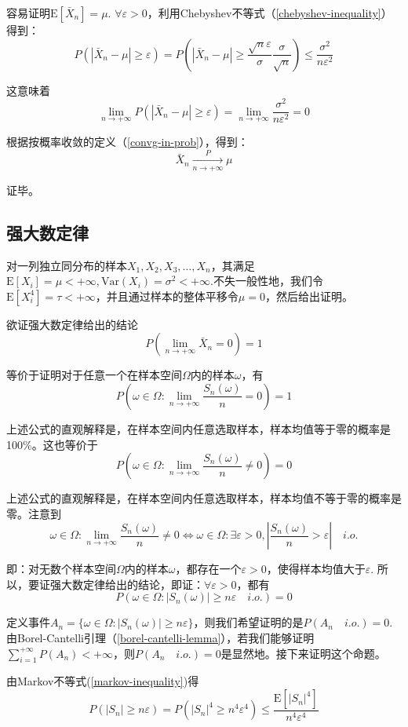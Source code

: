 \documentclass[UTF8]{ctexbook}
\begin{document}
容易证明$\mathrm E[\bar{X}_n]=\mu$. $\forall\varepsilon>0$，利用Chebyshev不等式（\ref{chebyshev-inequality}）得到：
\[
	P(|\bar{X}_n-\mu|\geq\varepsilon)=P(|\bar{X}_n-\mu|\geq\frac{\sqrt{n}\varepsilon}{\sigma}\frac{\sigma}{\sqrt{n}})\leq\frac{\sigma^2}{n\varepsilon^2}
\]

这意味着
\[
	\lim_{n\to+\infty}P(|\bar{X}_n-\mu|\geq\varepsilon)=\lim_{n\to+\infty}\frac{\sigma^2}{n\varepsilon^2}=0
\]

根据按概率收敛的定义（\ref{convg-in-prob}），得到：
\[
	\bar{X}_n\xrightarrow[n\to+\infty]{P}\mu
\]

证毕。
\subsection{强大数定律}
\label{SLLN-proof}
对一列独立同分布的样本$X_1,X_2,X_3,\dots,X_n$，其满足$\mathrm E[X_i]=\mu<+\infty,\mathrm{Var}(X_i)=\sigma^2<+\infty$.不失一般性地，我们令$\mathrm E[X_i^4]=\tau<+\infty$，并且通过样本的整体平移令$\mu=0$，然后给出证明。

欲证强大数定律给出的结论
\[
	P\left(\lim_{n\to+\infty}\bar{X}_n=0\right)=1
\]

等价于证明对于任意一个在样本空间$\Omega$内的样本$\omega$，有
\[
	P\left(\omega\in\Omega:\lim_{n\to+\infty}\frac{S_n(\omega)}{n}=0\right)=1
\]

上述公式的直观解释是，在样本空间内任意选取样本，样本均值等于零的概率是100\%。这也等价于
\[
	P\left(\omega\in\Omega:\lim_{n\to+\infty}\frac{S_n(\omega)}{n}\neq0\right)=0
\]

上述公式的直观解释是，在样本空间内任意选取样本，样本均值不等于零的概率是零。注意到
\[
	\omega\in\Omega:\lim_{n\to+\infty}\frac{S_n(\omega)}{n}\neq0\Longleftrightarrow\omega\in\Omega:\exists\varepsilon>0,\left|\frac{S_n(\omega)}{n}>\varepsilon\right|\quad i.o.
\]

即：对无数个样本空间$\Omega$内的样本$\omega$，都存在一个$\varepsilon>0$，使得样本均值大于$\varepsilon$. 所以，要证强大数定律给出的结论，即证：$\forall\varepsilon>0$，都有
\[
	P\left(\omega\in\Omega:|S_n(\omega)|\geq n\varepsilon\quad i.o.\right)=0
\]

定义事件$A_n=\{\omega\in\Omega:|S_n(\omega)|\geq n\varepsilon\}$，则我们希望证明的是$P(A_n\quad i.o.)=0$.由Borel-Cantelli引理（\ref{borel-cantelli-lemma}），若我们能够证明$\sum_{i=1}^{+\infty}P(A_n)<+\infty$，则$P(A_n\quad i.o.)=0$是显然地。接下来证明这个命题。

由Markov不等式(\ref{markov-inequality})得
\[
	P\left(|S_n|\geq n\varepsilon\right)=P\left(|S_n|^4\geq n^4\varepsilon^4\right)\leq\frac{\mathrm E[|S_n|^4]}{n^4\varepsilon^4}
\]
\end{document}
